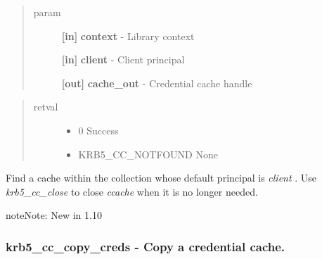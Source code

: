 \documentclass[letterpaper,10pt,english]{sphinxmanual}
\begin{document}
\begin{fulllineitems}
\label{appdev/refs/api/krb5_cc_cache_match:c.krb5_cc_cache_match}
\end{fulllineitems}

\begin{quote}\begin{description}
\item[{param}] \leavevmode
\textbf{{[}in{]}} \textbf{context} - Library context

\textbf{{[}in{]}} \textbf{client} - Client principal

\textbf{{[}out{]}} \textbf{cache\_out} - Credential cache handle

\end{description}\end{quote}
\begin{quote}\begin{description}
\item[{retval}] \leavevmode\begin{itemize}
\item {} 
0   Success

\item {} 
KRB5\_CC\_NOTFOUND   None

\end{itemize}

\end{description}\end{quote}

Find a cache within the collection whose default principal is \emph{client} . Use \emph{krb5\_cc\_close} to close \emph{ccache} when it is no longer needed.

\begin{notice}{note}{Note:}
New in 1.10
\end{notice}


\subsubsection{krb5\_cc\_copy\_creds -  Copy a credential cache.}
\label{appdev/refs/api/krb5_cc_copy_creds::doc}\label{appdev/refs/api/krb5_cc_copy_creds:krb5-cc-copy-creds-copy-a-credential-cache}
\end{document}
